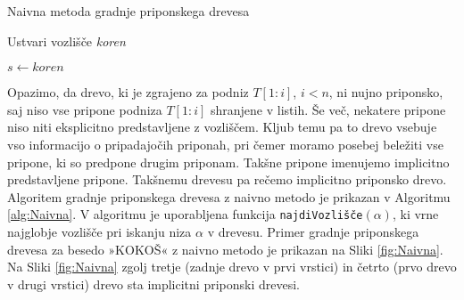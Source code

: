 \begin{algorithm}[htb]

    \caption{Naivna metoda gradnje priponskega drevesa}\label{alg:Naivna}
    {
        {Ustvari vozlišče \textit{koren}}
        
        {$s \leftarrow\textit{koren}$}
        
        
    }
\end{algorithm}

Opazimo, da drevo, ki je zgrajeno za podniz $T[1:i]$, $i< n$, ni nujno priponsko, saj niso vse pripone podniza $T[1:i]$ shranjene v listih. Še več, nekatere pripone niso niti eksplicitno predstavljene z vozliščem. Kljub temu pa to drevo vsebuje vso informacijo o pripadajočih priponah, pri čemer moramo posebej beležiti vse pripone, ki so predpone drugim priponam. Takšne pripone imenujemo implicitno predstavljene pripone. Takšnemu drevesu pa rečemo implicitno priponsko drevo. Algoritem gradnje priponskega drevesa z naivno metodo je prikazan v Algoritmu \ref{alg:Naivna}. V algoritmu je uporabljena funkcija \texttt{najdiVozlišče}$(\alpha)$, ki vrne najglobje vozlišče pri iskanju niza $\alpha$ v drevesu. Primer gradnje priponskega drevesa za besedo »KOKOŠ« z naivno metodo je prikazan na Sliki \ref{fig:Naivna}. Na Sliki \ref{fig:Naivna} zgolj tretje (zadnje drevo v prvi vrstici) in četrto (prvo drevo v drugi vrstici) drevo sta implicitni priponski drevesi.

